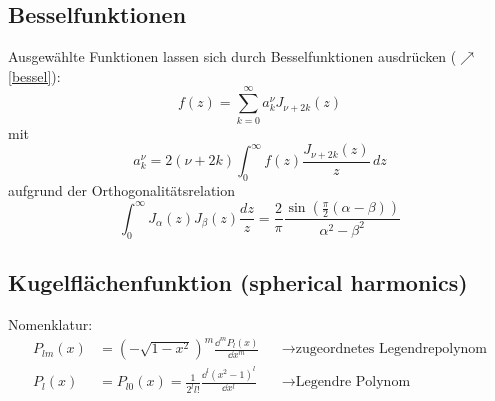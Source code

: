 	  \subsection{Besselfunktionen}
	  Ausgewählte Funktionen lassen sich durch Besselfunktionen ausdrücken ($\nearrow$\ref{bessel}):
	  \begin{equation}f(z)=\sum_{k=0}^\infty a_k^\nu J_{\nu+2k}(z)\end{equation}
	  mit
	   \begin{equation}a_k^\nu=2(\nu+2k) \int_0^\infty f(z) \frac{J_{\nu+2k}(z)}z \,dz\end{equation}
	  aufgrund der Orthogonalitätsrelation
	  \begin{equation}\int_0^\infty J_\alpha(z) J_\beta(z) \frac {dz} z= \frac 2 \pi \frac{\sin\left(\frac \pi 2 (\alpha-\beta) \right)}{\alpha^2 -\beta^2}\end{equation}
	  
  \subsection{Kugelflächenfunktion (spherical harmonics)}\label{kugelf}
Nomenklatur:
\begin{align}
	P_{lm}(x) &= (-\sqrt{1-x^2})^m \frac{\dd^m P_l(x)}{\dd x^m} &&\to  \text{zugeordnetes Legendrepolynom}\\
P_l(x) &= P_{l0}(x)= \frac{1}{2^l l!} \frac{\dd^l (x^2-1)^l}{\dd x^l} &&\to \text{Legendre Polynom}
\end{align}

